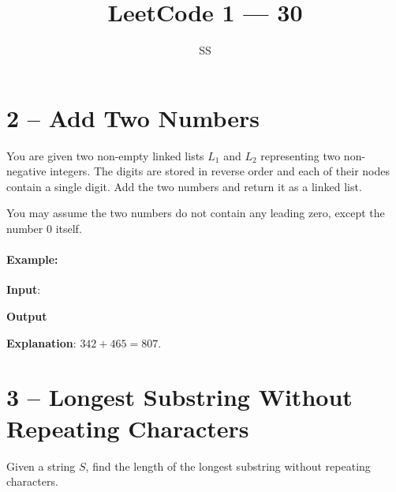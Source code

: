 \documentclass[a4paper,12pt]{article}
\title{LeetCode 1 --- 30}
\author{SS}
\begin{document}
\maketitle

\section{2 -- Add Two Numbers}
You are given two non-empty linked lists $L_1$ and $L_2$ representing two non-negative integers. The digits are stored in reverse order and each of their nodes contain a single digit. Add the two numbers and return it as a linked list.
\par
You may assume the two numbers do not contain any leading zero, except the number 0 itself.
\paragraph{Example:}
\begin{flushleft}
\textbf{Input}:
\begin{figure}[H]
\end{figure}
\textbf{Output}
\begin{figure}[H]
\end{figure}
\textbf{Explanation}: $342 + 465 = 807$.
\end{flushleft}


\section{3 --  Longest Substring Without Repeating Characters}
Given a string $S$, find the length of the longest substring without repeating characters.
\end{document}
